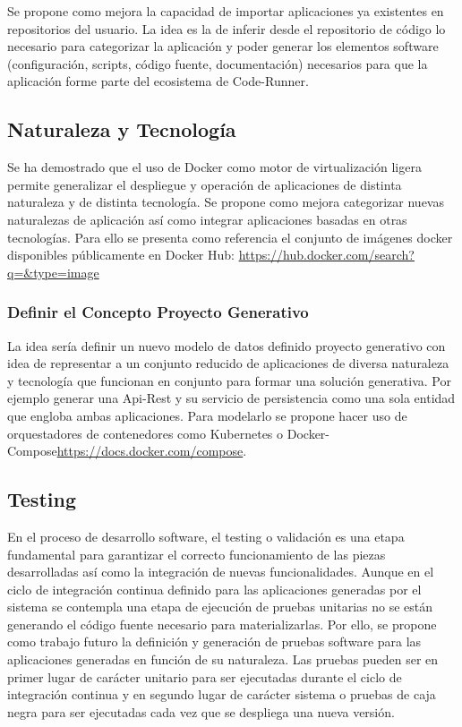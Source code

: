 \documentclass[a4paper,11pt]{book}
\begin{document}
Se propone como mejora la capacidad de importar aplicaciones ya existentes en repositorios del usuario. La idea es la de inferir desde el repositorio de código lo necesario para categorizar la aplicación y  poder generar los elementos software (configuración, scripts, código fuente, documentación) necesarios para que la aplicación forme parte del ecosistema de Code-Runner.  

\subsection{Naturaleza y Tecnología}

Se ha demostrado que el  uso de Docker como motor de virtualización ligera permite generalizar el despliegue y operación de aplicaciones de distinta naturaleza y de distinta tecnología. Se propone como mejora categorizar nuevas naturalezas de aplicación así como integrar aplicaciones basadas en otras tecnologías. Para ello se presenta como referencia el conjunto de imágenes docker disponibles públicamente en Docker Hub:\cite{dhub}   \url{https://hub.docker.com/search?q=&type=image}

\subsubsection{Definir el Concepto Proyecto Generativo}

La idea sería definir un nuevo modelo de datos definido proyecto generativo con idea de representar a un conjunto reducido de aplicaciones de diversa naturaleza y tecnología que funcionan en conjunto para formar una solución generativa. Por ejemplo generar una Api-Rest y su servicio de persistencia como una sola entidad que engloba ambas aplicaciones. Para modelarlo se propone hacer uso de orquestadores de contenedores como Kubernetes\cite{kube} o Docker-Compose\url{https://docs.docker.com/compose}.  

\subsection{Testing}

 En el proceso de desarrollo software, el testing o validación es una etapa fundamental para garantizar el correcto funcionamiento de las piezas desarrolladas así como la integración de nuevas funcionalidades. Aunque en el ciclo de integración continua definido para las aplicaciones generadas por el sistema se contempla una etapa de ejecución de pruebas unitarias no se están generando el código fuente necesario para materializarlas. Por ello, se propone como trabajo futuro la definición y generación de pruebas software para las aplicaciones generadas en función de su naturaleza. Las pruebas pueden ser en primer lugar de carácter unitario para ser ejecutadas durante el ciclo de integración continua y en segundo lugar de carácter sistema o pruebas de caja negra para ser ejecutadas cada vez que se despliega una nueva versión. 
\end{document}

